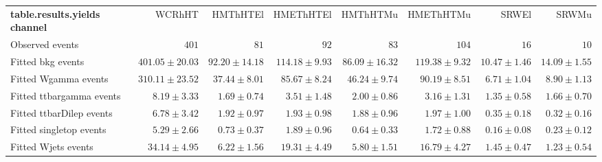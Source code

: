 

\begin{table}
\begin{center}
\setlength{\tabcolsep}{0.0pc}
{\small
\begin{tabular*}{\textwidth}{@{\extracolsep{\fill}}lrrrrrrr}
\noalign{\smallskip}\hline\noalign{\smallskip}
{\bf table.results.yields channel}           & WCRhHT            & HMThHTEl            & HMEThHTEl            & HMThHTMu            & HMEThHTMu            & SRWEl            & SRWMu              \\[-0.05cm]
\noalign{\smallskip}\hline\noalign{\smallskip}
Observed events          & $401$              & $81$              & $92$              & $83$              & $104$              & $16$              & $10$                    \\
\noalign{\smallskip}\hline\noalign{\smallskip}
Fitted bkg events         & $401.05 \pm 20.03$          & $92.20 \pm 14.18$          & $114.18 \pm 9.93$          & $86.09 \pm 16.32$          & $119.38 \pm 9.32$          & $10.47 \pm 1.46$          & $14.09 \pm 1.55$              \\
\noalign{\smallskip}\hline\noalign{\smallskip}
        Fitted Wgamma events         & $310.11 \pm 23.52$          & $37.44 \pm 8.01$          & $85.67 \pm 8.24$          & $46.24 \pm 9.74$          & $90.19 \pm 8.51$          & $6.71 \pm 1.04$          & $8.90 \pm 1.13$              \\
        Fitted ttbargamma events         & $8.19 \pm 3.33$          & $1.69 \pm 0.74$          & $3.51 \pm 1.48$          & $2.00 \pm 0.86$          & $3.16 \pm 1.31$          & $1.35 \pm 0.58$          & $1.66 \pm 0.70$              \\
        Fitted ttbarDilep events         & $6.78 \pm 3.42$          & $1.92 \pm 0.97$          & $1.93 \pm 0.98$          & $1.88 \pm 0.96$          & $1.97 \pm 1.00$          & $0.35 \pm 0.18$          & $0.32 \pm 0.16$              \\
        Fitted singletop events         & $5.29 \pm 2.66$          & $0.73 \pm 0.37$          & $1.89 \pm 0.96$          & $0.64 \pm 0.33$          & $1.72 \pm 0.88$          & $0.16 \pm 0.08$          & $0.23 \pm 0.12$              \\
        Fitted Wjets events         & $34.14 \pm 4.95$          & $6.22 \pm 1.56$          & $19.31 \pm 4.49$          & $5.80 \pm 1.51$          & $16.79 \pm 4.27$          & $1.45 \pm 0.47$          & $1.23 \pm 0.54$              \\

\end{tabular*}}
\end{center}
\end{table}
